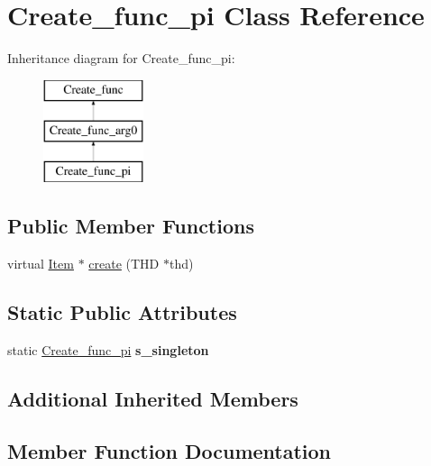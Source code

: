 \hypertarget{classCreate__func__pi}{}\section{Create\+\_\+func\+\_\+pi Class Reference}
\label{classCreate__func__pi}
Inheritance diagram for Create\+\_\+func\+\_\+pi\+:\begin{figure}[H]
\begin{center}
\leavevmode
\includegraphics[height=3.000000cm]{classCreate__func__pi}
\end{center}
\end{figure}
\subsection*{Public Member Functions}
\begin{DoxyCompactItemize}
\item 
virtual \mbox{\hyperlink{classItem}{Item}} $\ast$ \mbox{\hyperlink{classCreate__func__pi_a3d36805732a46676f626b3c3826e05b0}{create}} (T\+HD $\ast$thd)
\end{DoxyCompactItemize}
\subsection*{Static Public Attributes}
\begin{DoxyCompactItemize}
\item 
\mbox{\label{classCreate__func__pi_a88497d2ad18c6dd59684fcb2319d99ca}} 
static \mbox{\hyperlink{classCreate__func__pi}{Create\+\_\+func\+\_\+pi}} {\bfseries s\+\_\+singleton}
\end{DoxyCompactItemize}
\subsection*{Additional Inherited Members}


\subsection{Member Function Documentation}
\mbox{\label{classCreate__func__pi_a3d36805732a46676f626b3c3826e05b0}} 

